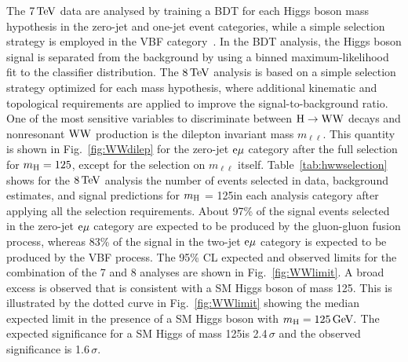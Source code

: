 \documentclass[11pt,twoside,a4paper,cmspaper,final]{cms-tdr}
\begin{document}
The $7\,\text{Te\hspace{-.08em}V}$ data are
analysed by training a BDT for each
Higgs boson mass hypothesis in the zero-jet and one-jet event categories,
while a simple selection strategy is employed in the VBF
category~\cite{Chatrchyan:2012ty}.  In the BDT analysis, the Higgs boson
signal is separated
from the background by using a binned maximum-likelihood fit
to the classifier distribution.  The $8\,\text{Te\hspace{-.08em}V}$ analysis is based on a
simple selection strategy optimized for each mass hypothesis, where
additional kinematic and topological
requirements are applied to improve the signal-to-background ratio.
One of the most sensitive variables to discriminate between
$\mathrm{H} \to \mathrm{W}\mathrm{W}$ decays and nonresonant $\mathrm{W}\mathrm{W}$ production
is the dilepton invariant mass $m_{\ell\ell}$.
This quantity is shown in Fig.~\ref{fig:WWdilep}
for the zero-jet $\mathrm{e}{\mu}$ category after the full selection
for $m_{\mathrm{H}}=125$\GeV, except for the
selection on $m_{\ell\ell}$ itself.
Table~\ref{tab:hwwselection} shows for the $8\,\text{Te\hspace{-.08em}V}$ analysis
the number of events selected in data, background estimates, and signal
predictions for $m_{\mathrm{H}}$ = 125\GeV in each
analysis category after applying all the selection requirements.
About 97\% of the signal events selected in the zero-jet
$\mathrm{e}{\mu}$ category are expected to be produced by the gluon-gluon fusion process,
whereas 83\% of the signal in the two-jet $\mathrm{e}{\mu}$ category is expected
to be produced by the VBF process.
The 95\% CL expected and
observed limits for the combination of the 7 and 8\TeV
analyses are shown in Fig.~\ref{fig:WWlimit}.
A broad excess is observed that is consistent with a SM Higgs boson of mass 125\GeV.
This is illustrated by the dotted curve in Fig.~\ref{fig:WWlimit} showing the median expected limit
in the presence of a SM Higgs boson with $m_{\mathrm{H}}=125\,\text{Ge\hspace{-.08em}V}.$
The expected significance for a SM Higgs of mass
125\GeV is 2.4$\,\sigma$ and the observed significance is 1.6$\,\sigma$.
\end{document}
